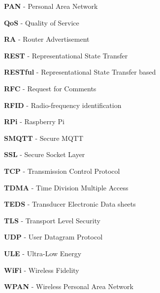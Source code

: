 \documentclass{article}
\begin{document}
\textbf{PAN} - Personal Area Network
\newline

\textbf{QoS} - Quality of Service
\newline

\textbf{RA} - Router Advertisement
\newline

\textbf{REST} - Representational State Transfer
\newline

\textbf{RESTful} - Representational State Transfer based
\newline

\textbf{RFC} - Request for Comments
\newline

\textbf{RFID} - Radio-frequency identification
\newline

\textbf{RPi} - Raspberry Pi
\newline

\textbf{SMQTT} - Secure MQTT
\newline

\textbf{SSL} - Secure Socket Layer
\newline

\textbf{TCP} - Transmission Control Protocol
\newline

\textbf{TDMA} - Time Division Multiple Access
\newline

\textbf{TEDS} - Transducer Electronic Data sheets
\newline

\textbf{TLS} - Transport Level Security
\newline

\textbf{UDP} - User Datagram Protocol
\newline

\textbf{ULE} - Ultra-Low Energy
\newline

\textbf{WiFi} - Wireless Fidelity
\newline

\textbf{WPAN} - Wireless Personal Area Network



\newpage
\tableofcontents
\end{document}
